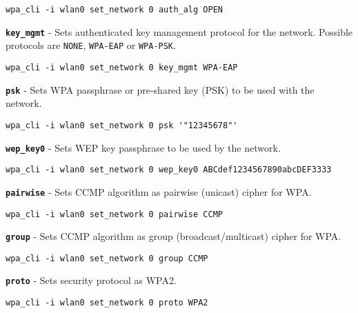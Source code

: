 	\begin{lstlisting}[style=framelesstext]
	wpa_cli -i wlan0 set_network 0 auth_alg OPEN
	\end{lstlisting}

\noindent
{} \texttt{\bfseries key\_mgmt} - Sets authenticated key management protocol for the network. Possible protocols are \texttt{NONE}, \texttt{WPA-EAP} or \texttt{WPA-PSK}.

	\begin{lstlisting}[style=framelesstext]
	wpa_cli -i wlan0 set_network 0 key_mgmt WPA-EAP
	\end{lstlisting}

\noindent
{} \texttt{\bfseries psk} - Sets WPA passphrase or pre-shared key (PSK) to be used with the network.

	\begin{lstlisting}[style=framelesstext]
	wpa_cli -i wlan0 set_network 0 psk '"12345678"'
	\end{lstlisting}

\noindent
{} \texttt{\bfseries wep\_key0} - Sets WEP key passphrase to be used by the network.

	\begin{lstlisting}[style=framelesstext]
	wpa_cli -i wlan0 set_network 0 wep_key0 ABCdef1234567890abcDEF3333
	\end{lstlisting}


\noindent
{} \texttt{\bfseries pairwise} - Sets CCMP algorithm as pairwise (unicast) cipher for WPA.

	\begin{lstlisting}[style=framelesstext]
	wpa_cli -i wlan0 set_network 0 pairwise CCMP
	\end{lstlisting}


\noindent
{} \texttt{\bfseries group} - Sets CCMP algorithm as group (broadcast/multicast) cipher for WPA.

	\begin{lstlisting}[style=framelesstext]
	wpa_cli -i wlan0 set_network 0 group CCMP
	\end{lstlisting}


\noindent
{} \texttt{\bfseries proto} - Sets security protocol as WPA2.

    \begin{lstlisting}[style=framelesstext]
   	wpa_cli -i wlan0 set_network 0 proto WPA2
    \end{lstlisting}


